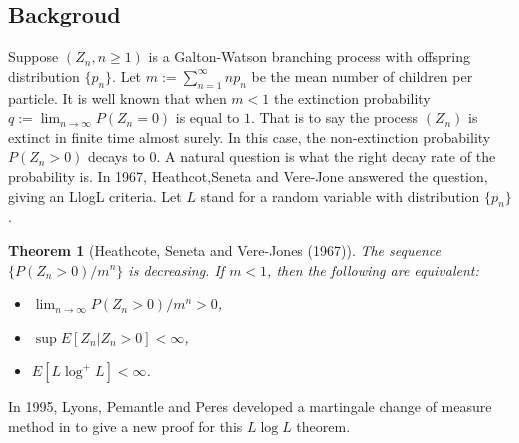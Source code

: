 \documentclass[12pt,a4paper]{amsart}
\theoremstyle{plain}
\newtheorem{thm}{Theorem}[section]
\theoremstyle{definition}
\numberwithin{equation}{section}
\begin{document}
\subsection{Backgroud}
Suppose $(Z_n, n\ge 1)$ is a Galton-Watson branching process with offspring
distribution $\{p_n\}$. Let $m:=\sum^{\infty}_{n=1}np_n$ be the mean number of
children per particle. It is well known that when $m<1$ the extinction
probability $q:=\lim_{n\rightarrow\infty}P\left(Z_n=0\right)$ is equal to $1$.
That is to say the process $(Z_n)$ is extinct in finite time almost surely. In
this case, the non-extinction probability $P(Z_n>0)$ decays to $0$. A natural
question is what the right decay rate of the probability is. In 1967,
Heathcot,Seneta and Vere-Jone \cite{HeathcoteSenetaVere-Jones1967A-refinement}
answered the question, giving an LlogL criteria. Let $L$ stand for a random
variable with distribution $\{p_n\}$.

\begin{thm}[Heathcote, Seneta and Vere-Jones (1967)]
  The sequence $\{ P(Z_n>0)/m^n\}$ is decreasing. If $m<1$, then the following
  are equivalent:
  \begin{itemize}
  \item[$(i).$] $\lim_{n\rightarrow\infty}P(Z_n>0)/m^n>0$,
  \item[$(ii).$] $\sup E[Z_n|Z_n>0]<\infty$,
  \item[$(iii).$] $E\left[L\log^+ L\right]<\infty$.
  \end{itemize}
\end{thm}
In 1995, Lyons, Pemantle and Peres developed a martingale change of measure
method in \cite{LyonsPemantlePeres1995Conceptual} to give a new proof for this
$L\log L$ theorem.
\end{document}
